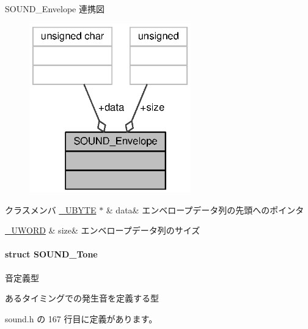 S\+O\+U\+N\+D\+\_\+\+Envelope 連携図
\nopagebreak
\begin{figure}[H]
\begin{center}
\leavevmode
\includegraphics[width=198pt]{d4/d37/structSOUND__Envelope__coll__graph}
\end{center}
\end{figure}
\begin{DoxyFields}{クラスメンバ}
\hyperlink{stddef_8h_aac464b47452ce9406f88ef194e2becc1_aac464b47452ce9406f88ef194e2becc1}{\+\_\+\+U\+B\+Y\+T\+E} $\ast$\label{sound_8h_ad368fb20a4f66ce37f393a9e76669c2c}
&
data&
エンベロープデータ列の先頭へのポインタ \\
\hline

\hyperlink{stddef_8h_af4b45f5ec97da370bd2173b4fe891d76_af4b45f5ec97da370bd2173b4fe891d76}{\+\_\+\+U\+W\+O\+R\+D}\label{sound_8h_af1860938a43db18c94c5e455a3d30f92}
&
size&
エンベロープデータ列のサイズ \\
\hline

\end{DoxyFields}
\label{structSOUND__Tone}
\paragraph{struct S\+O\+U\+N\+D\+\_\+\+Tone}
音定義型 

あるタイミングでの発生音を定義する型 

 sound.\+h の 167 行目に定義があります。



